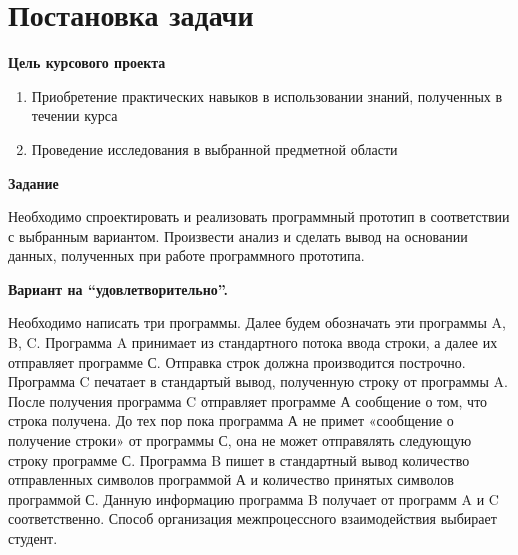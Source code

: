 \section{Постановка задачи}

\textbf{Цель курсового проекта}

\begin{enumerate}
    \item Приобретение практических навыков в использовании знаний, полученных в течении курса
    \item Проведение исследования в выбранной предметной области
\end{enumerate}

\textbf{Задание}

Необходимо спроектировать и реализовать программный прототип в соответствии с выбранным
вариантом. Произвести анализ и сделать вывод на основании данных, полученных при работе
программного прототипа.

\textbf{Вариант на \enquote{удовлетворительно}.}

Необходимо написать три программы. Далее будем обозначать эти программы A, B, C.
Программа A принимает из стандартного потока ввода строки, а далее их отправляет программе
С. Отправка строк должна производится построчно. Программа C печатает в стандартый вывод,
полученную строку от программы A. После получения программа C отправляет программе А
сообщение о том, что строка получена. До тех пор пока программа А не примет «сообщение о
получение строки» от программы С, она не может отправялять следующую строку программе С.
Программа B пишет в стандартный вывод количество отправленных символов программой А и
количество принятых символов программой С. Данную информацию программа B получает от
программ A и C соответственно.
Способ организация межпроцессного взаимодействия выбирает студент.

\pagebreak
